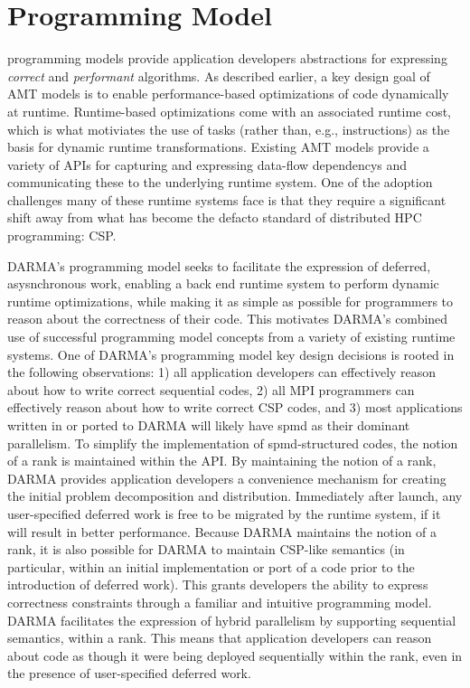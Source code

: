 

\section{Programming Model}
\label{sec:programmingmodel}

\Glspl{programming model} provide application developers 
abstractions for expressing \emph{correct} and \emph{performant} algorithms. 
As described earlier, a key design goal of \gls{AMT} models is to enable performance-based
optimizations of code dynamically at runtime.
Runtime-based optimizations come with an associated runtime cost, which is what
motiviates the use of \glspl{task} (rather than, e.g., instructions) as the basis for dynamic runtime transformations.
Existing \gls{AMT} models provide a variety of \glspl{API} for capturing and expressing
\glspl{data-flow dependency} and communicating these to the underlying
\gls{runtime system}.  
One of the adoption challenges many of these \glspl{runtime system} face is
that they require a significant shift away from what has become
the defacto standard of distributed HPC programming: \gls{CSP}. 

\gls{DARMA}'s \gls{programming model} seeks to facilitate the expression of
deferred, asysnchronous work, enabling a \gls{back end} \gls{runtime system}
to perform dynamic runtime optimizations, while making it as simple as possible
for programmers to reason about the correctness of their code.
This motivates \gls{DARMA}'s combined use of successful \gls{programming model}
concepts from a variety of existing \glspl{runtime system}. 
One of \gls{DARMA}'s \gls{programming model} key design decisions is rooted in
the following observations: 
1) all application
developers can effectively reason about how to write correct sequential codes,
2) all MPI
programmers can effectively reason about how to write correct \gls{CSP} codes,
and
3) most applications written in or ported to \gls{DARMA} will likely
have \gls{spmd} as their dominant parallelism.
To simplify the implementation of \gls{spmd}-structured codes, the notion of a
\gls{rank} is maintained within the \gls{API}.   
By maintaining the notion of a \gls{rank}, \gls{DARMA} provides application developers a convenience mechanism for creating
the initial problem decomposition and distribution.
Immediately after launch, any user-specified \gls{deferred work} is free to be
migrated by the \gls{runtime system}, if it will result in
better performance.
Because \gls{DARMA} maintains the notion of a \gls{rank}, it is also
possible for \gls{DARMA} to maintain \gls{CSP}-like semantics (in particular, within an initial
implementation or port of a code prior to the introduction of \gls{deferred
work}). 
This grants developers the ability to express correctness constraints through a familiar and
intuitive \gls{programming model}.  
\gls{DARMA} facilitates the expression of hybrid parallelism by supporting  
\gls{sequential semantics}, within a \gls{rank}.  This means that application
developers can reason about code as
though it were being deployed sequentially within the \gls{rank}, even in
the presence of user-specified \gls{deferred work}.   

